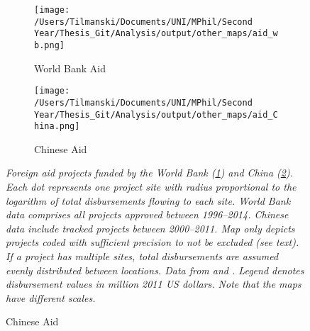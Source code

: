 \documentclass[11pt, oneside]{article}   	%
\let\oldref\ref
\renewcommand{\ref}[1]{(\oldref{#1})}
\newcommand{\mysubcaption}[1]{
\justify
\begin{spacing}{0.7}
\textit{\footnotesize #1}
\end{spacing}}
\begin{document}
\begin{figure}[t]
\centering
\caption{Spatial Distribution of Development Aid Projects to African Nations}

\begin{subfigure}[c]{0.48\textwidth}
\texttt{[image: /Users/Tilmanski/Documents/UNI/MPhil/Second Year/Thesis\_Git/Analysis/output/other\_maps/aid\_wb.png]}
\caption{World Bank Aid}
\label{fig:WB_aid_map}
\end{subfigure}
\begin{subfigure}[c]{0.48\textwidth}
\texttt{[image: /Users/Tilmanski/Documents/UNI/MPhil/Second Year/Thesis\_Git/Analysis/output/other\_maps/aid\_China.png]}
\caption{Chinese Aid}
\label{fig:China_aid_map}
\end{subfigure}

\label{fig:Aid_maps}
\mysubcaption{Foreign aid projects funded by the World Bank \ref{fig:WB_aid_map} and China \ref{fig:China_aid_map}. Each dot represents one project site with radius proportional to the logarithm of total disbursements flowing to each site. World Bank data comprises all projects approved between 1996--2014. Chinese data include tracked projects between 2000--2011. Map only depicts projects coded with sufficient precision to not be excluded (see text). If a project has multiple sites, total disbursements are assumed evenly distributed between locations. Data from \cite{AidData_WorldBankGeocoded_2017} and \cite{Strange_TrackingUnderreportedFinancial_2017}. Legend denotes disbursement values in million 2011 US dollars. Note that the maps have different scales.}
\end{figure}
\end{document}
